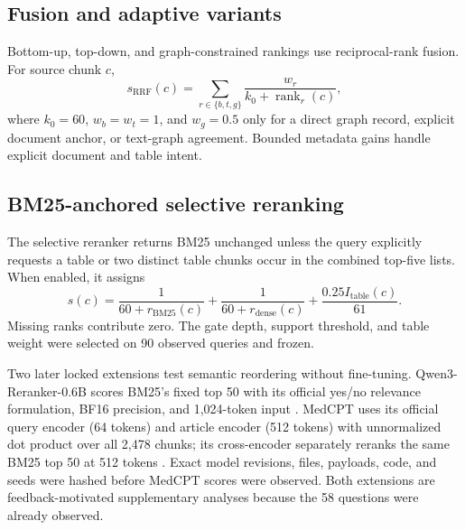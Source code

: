 \subsection{Fusion and adaptive variants}

Bottom-up, top-down, and graph-constrained rankings use reciprocal-rank fusion. For source chunk $c$,
\begin{equation}
s_{\mathrm{RRF}}(c)=\sum_{r\in\{b,t,g\}}\frac{w_r}{k_0+\operatorname{rank}_r(c)},
\end{equation}
where $k_0=60$, $w_b=w_t=1$, and $w_g=0.5$ only for a direct graph record, explicit document anchor, or text-graph agreement. Bounded metadata gains handle explicit document and table intent.

\subsection{BM25-anchored selective reranking}

The selective reranker returns BM25 unchanged unless the query explicitly requests a table or two distinct table chunks occur in the combined top-five lists. When enabled, it assigns
\begin{equation}
s(c)=\frac{1}{60+r_{\mathrm{BM25}}(c)}+\frac{1}{60+r_{\mathrm{dense}}(c)}+\frac{0.25I_{\mathrm{table}}(c)}{61}.
\end{equation}
Missing ranks contribute zero. The gate depth, support threshold, and table weight were selected on 90 observed queries and frozen.

Two later locked extensions test semantic reordering without fine-tuning. Qwen3-Reranker-0.6B scores BM25's fixed top 50 with its official yes/no relevance formulation, BF16 precision, and 1,024-token input \cite{zhang2025qwen3embedding}. MedCPT uses its official query encoder (64 tokens) and article encoder (512 tokens) with unnormalized dot product over all 2,478 chunks; its cross-encoder separately reranks the same BM25 top 50 at 512 tokens \cite{jin2023medcpt}. Exact model revisions, files, payloads, code, and seeds were hashed before MedCPT scores were observed. Both extensions are feedback-motivated supplementary analyses because the 58 questions were already observed.
